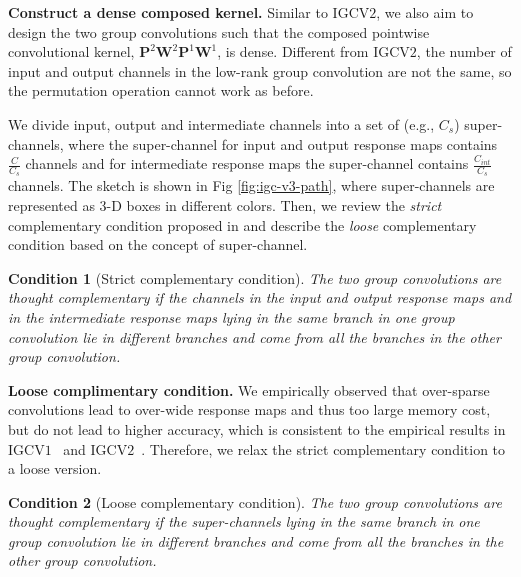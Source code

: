 \documentclass{bmvc2k}
\begin{document}
	\noindent\textbf{Construct a dense composed kernel.}
	Similar to IGCV$2$, we also aim to design the two group convolutions such that
	the composed pointwise convolutional kernel, $\mathbf{P}^2\mathbf{W}^2\mathbf{P}^1\mathbf{W}^1$, is dense. Different from IGCV$2$, the number of input and output channels in the low-rank group convolution are not the same, so the permutation operation cannot work as before.

	We divide input, output and intermediate channels into a set of (e.g., $C_s$) super-channels, where the super-channel for input and output response maps contains $\frac{C}{C_s}$ channels and for intermediate response maps the super-channel contains $\frac{C_{int}}{C_s}$ channels.
	The sketch is shown in Fig \ref{fig:igc-v3-path}, where super-channels are represented as 3-D boxes in different colors.
	Then, we review the \emph{strict} complementary condition proposed in \cite{ISSC18} and describe the \emph{loose} complementary condition based on the concept of super-channel.

	\newtheorem{condition}{Condition}

	\begin{condition}[Strict complementary condition]
		The two group convolutions are thought complementary
		if
		the channels in the input and output response maps and
		in the intermediate response maps
		lying in the same branch
		in one group convolution
		lie in different branches
		and come from all the branches in the other group convolution.
	\end{condition}

	\noindent\textbf{Loose complimentary condition.}
	We empirically observed that
	over-sparse convolutions lead to over-wide response maps
	and thus too large memory cost,
	but do not lead to higher accuracy,
	which is consistent to the empirical results in IGCV$1$~\cite{zhang2017interleaved} and IGCV$2$~\cite{ISSC18}.
	Therefore,
	we relax the strict complementary condition
	to a loose version.
	\begin{condition}[Loose complementary condition]
		The two group convolutions are thought complementary
		if
		the super-channels lying in the same branch
		in one group convolution
		lie in different branches
		and come from all the branches in the other group convolution.
	\end{condition}
\end{document}
